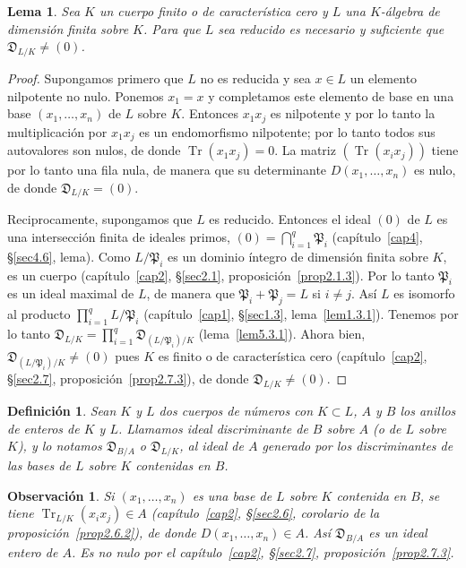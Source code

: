 \documentclass[oneside,bibtotoc,leqno,spanish]{amsbook}
\newcommand{\idl}[1]{\mathfrak{#1}}
\newcommand{\QED}{}%
\newcommand{\disc}{\mathfrak{D}}
\DeclareMathOperator{\Tr}{Tr}
\numberwithin{equation}{section}
\theoremstyle{defi}
\newtheorem{definition}{Definici\'on}
\theoremstyle{note}
\newtheorem{lemma}{Lema}
\theoremstyle{rem}
\newtheorem{remark}{Observaci\'on}
\numberwithin{theorem}{section}
\numberwithin{proposition}{section}
\numberwithin{definition}{section}
\numberwithin{lemma}{section}
\numberwithin{corollary}{section}
\numberwithin{example}{section}
\numberwithin{footnote}{section}%
\begin{document}
\begin{lemma}\label{lem5.3.3}
Sea $K$ un cuerpo finito o de caracter\'istica cero y $L$ una $K$-\'algebra de dimensi\'on finita sobre $K$.
Para que $L$ sea reducido es necesario y suficiente que $\disc_{L/K}\neq(0)$.
\end{lemma}

\begin{proof}
Supongamos primero que $L$ no es reducida y sea $x\in L$ un elemento nilpotente no nulo. Ponemos $x_{1}=x$ y
completamos este elemento de base en una base $(x_{1},\dots,x_{n})$ de $L$ sobre $K$. Entonces $x_{1}x_{j}$
es nilpotente y por lo tanto la multiplicaci\'on por $x_{1}x_{j}$ es un endomorfismo nilpotente; por lo tanto
todos sus autovalores son nulos, de donde $\Tr(x_{1}x_{j}) = 0$. La matriz $(\Tr(x_{i}x_{j}))$ tiene por lo tanto
una fila nula, de manera que su determinante $D(x_{1},\dots,x_{n})$ es nulo, de donde $\disc_{L/K}=(0)$.

Reciprocamente, supongamos que $L$ es reducido. Entonces el ideal $(0)$ de $L$ es una intersecci\'on finita
de ideales primos, $(0) = \bigcap_{i=1}^{q}\idl{P}_{i}$ (cap\'itulo~\ref{cap4}, \S\ref{sec4.6}, lema).
Como $L/\idl{P}_{i}$ es un dominio \'integro de dimensi\'on finita sobre $K$, es un cuerpo (cap\'itulo~\ref{cap2},
\S\ref{sec2.1}, proposici\'on~\ref{prop2.1.3}).
Por lo tanto $\idl{P}_{i}$ es un ideal maximal de $L$, de manera que $\idl{P}_{i}+\idl{P}_{j}=L$
si $i\neq j$. As\'i $L$ es isomorfo al producto $\prod_{i=1}^{q}L/\idl{P}_{i}$ (cap\'itulo~\ref{cap1}, \S\ref{sec1.3}, lema~\ref{lem1.3.1}).
Tenemos por lo tanto $\disc_{L/K}=\prod_{i=1}^{q}\disc_{(L/\idl{P}_{i})/K}$
(lema~\ref{lem5.3.1}). Ahora bien,
$\disc_{(L/\idl{P}_{i})/K}\neq(0)$ pues $K$ es finito o de caracter\'istica cero
(cap\'itulo~\ref{cap2}, \S\ref{sec2.7}, proposici\'on~\ref{prop2.7.3}), de donde $\disc_{L/K}\neq(0)$. \QED
\end{proof}

\begin{definition}\label{defV.3.1}
Sean $K$ y $L$ dos cuerpos de n\'umeros con $K\subset L$, $A$ y $B$ los anillos de enteros de $K$ y $L$.
Llamamos ideal discriminante de $B$ sobre $A$ (o de $L$ sobre $K$), y lo notamos $\disc_{B/A}$ o $\disc_{L/K}$,
al ideal de $A$ generado por los discriminantes de las bases de $L$ sobre $K$ contenidas en $B$.
\end{definition}

\begin{remark}
Si $(x_{1},\dots,x_{n})$ es una base de $L$ sobre $K$ contenida en $B$,
se tiene $\Tr_{L/K}(x_{i}x_{j})\in A$ (cap\'itulo~\ref{cap2}, \S\ref{sec2.6}, corolario de la proposici\'on~\ref{prop2.6.2}), de donde
$D(x_{1},\dots,x_{n})\in A$. As\'i $\disc_{B/A}$ es un ideal {\em entero} de $A$. Es {\em no nulo} por
el cap\'itulo~\ref{cap2}, \S\ref{sec2.7}, proposici\'on~\ref{prop2.7.3}.
\end{remark}
\end{document}

